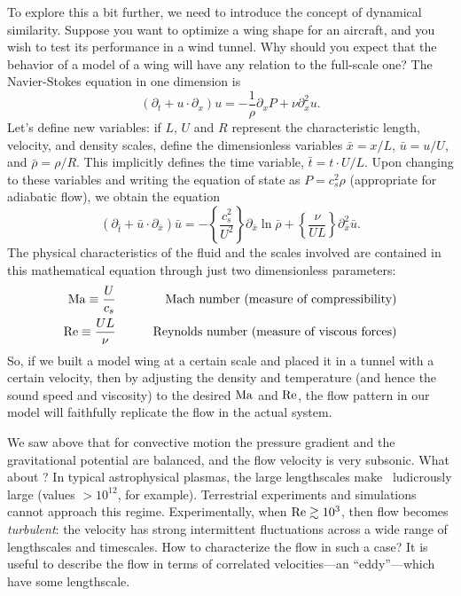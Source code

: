 To explore this a bit further, we need to introduce the concept of dynamical similarity.  Suppose you want to optimize a wing shape for an aircraft, and you wish to test its performance in a wind tunnel.  Why should you expect that the behavior of a model of a wing will have any relation to the full-scale one?  The Navier-Stokes equation in one dimension is
\[
	(\partial_{t} + u\cdot\partial_{x})u = -\frac{1}{\rho}\partial_{x}P + \nu \partial_{x}^{2}u.
\]
Let's define new variables: if $L$, $U$ and $R$ represent the characteristic length, velocity, and density scales, define the dimensionless variables $\bar{x} = x / L$, $\bar{u} = u / U$, and $\bar{\rho} = \rho/R$. This implicitly defines the time variable, $\bar{t} = t\cdot U/L$. Upon changing to these variables and writing the equation of state as $P = c_{s}^{2} \rho$ (appropriate for adiabatic flow), we obtain the equation
\begin{equation}\label{e.scaled-NS}
	(\partial_{\bar{t}} + \bar{u}\cdot\partial_{\bar{x}})\bar{u} = -\left\{\frac{c_{s}^{2}}{U^{2}}\right\}\partial_{\bar{x}}\ln\bar{\rho} + \left\{\frac{\nu}{UL}\right\} \partial_{\bar{x}}^{2}\bar{u}.
\end{equation}
The physical characteristics of the fluid and the scales involved are contained in this mathematical equation through just two dimensionless parameters:
\begin{eqnarray*}
 \mathrm{Ma}\equiv\frac{U}{c_{s}}&\qquad& \textrm{Mach number (measure of compressibility)}\\
 \mathrm{Re}\equiv \frac{UL}{\nu} &\qquad& \textrm{Reynolds number (measure of viscous forces)}
\end{eqnarray*}
So, if we built a model wing at a certain scale and placed it in a tunnel with a certain velocity, then by adjusting the density and temperature (and hence the sound speed and viscosity) to the desired $\mathrm{Ma}$ and $\mathrm{Re}$, the flow pattern in our model will faithfully replicate the flow in the actual system.

We saw above that for convective motion the pressure gradient and the gravitational potential are balanced, and the flow velocity is very subsonic.  What about \Rey?  In typical astrophysical plasmas, the large lengthscales make \Rey\ ludicrously large (values $>10^{12}$, for example). Terrestrial experiments and simulations cannot approach this regime. Experimentally, when $\mathrm{Re} \gtrsim 10^{3}$, then flow becomes \emph{turbulent}: the velocity has strong intermittent fluctuations across a wide range of lengthscales and timescales.  How to characterize the flow in such a case? It is useful to describe the flow in terms of correlated velocities---an ``eddy''---which have some lengthscale.

